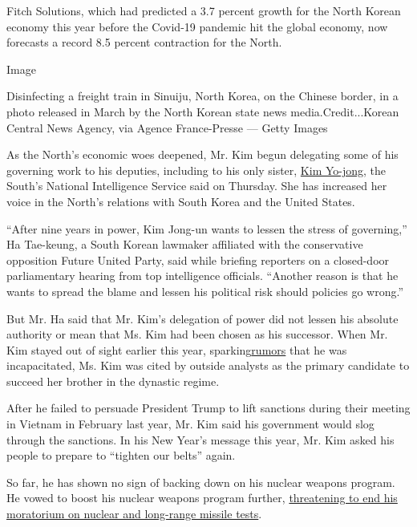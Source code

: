 Fitch Solutions, which had predicted a 3.7 percent growth for the North
Korean economy this year before the Covid-19 pandemic hit the global
economy, now forecasts a record 8.5 percent contraction for the North.

Image

Disinfecting a freight train in Sinuiju, North Korea, on the Chinese
border, in a photo released in March by the North Korean state news
media.Credit...Korean Central News Agency, via Agence France-Presse ---
Getty Images

As the North's economic woes deepened, Mr. Kim begun delegating some of
his governing work to his deputies, including to his only sister,
\href{https://slack-redir.net/link?url=https\%3A\%2F\%2Fwww.nytimes3xbfgragh.onion\%2F2020\%2F06\%2F17\%2Fworld\%2Fasia\%2Fnorth-korea-kim-yo-jong.html}{Kim
Yo-jong}, the South's National Intelligence Service said on Thursday.
She has increased her voice in the North's relations with South Korea
and the United States.

``After nine years in power, Kim Jong-un wants to lessen the stress of
governing,'' Ha Tae-keung, a South Korean lawmaker affiliated with the
conservative opposition Future United Party, said while briefing
reporters on a closed-door parliamentary hearing from top intelligence
officials. ``Another reason is that he wants to spread the blame and
lessen his political risk should policies go wrong.''

But Mr. Ha said that Mr. Kim's delegation of power did not lessen his
absolute authority or mean that Ms. Kim had been chosen as his
successor. When Mr. Kim stayed out of sight earlier this year,
sparking\href{https://slack-redir.net/link?url=https\%3A\%2F\%2Fwww.nytimes3xbfgragh.onion\%2F2020\%2F04\%2F26\%2Fworld\%2Fasia\%2Fkim-jong-un-absence-north-korea.html}{rumors}
that he was incapacitated, Ms. Kim was cited by outside analysts as the
primary candidate to succeed her brother in the dynastic regime.

After he failed to persuade President Trump to lift sanctions during
their meeting in Vietnam in February last year, Mr. Kim said his
government would slog through the sanctions. In his New Year's message
this year, Mr. Kim asked his people to prepare to ``tighten our belts''
again.

So far, he has shown no sign of backing down on his nuclear weapons
program. He vowed to boost his nuclear weapons program further,
\href{https://www.nytimes3xbfgragh.onion/2019/12/31/world/asia/north-korea-kim-speech.html}{threatening
to end his moratorium on nuclear and long-range missile tests}.

